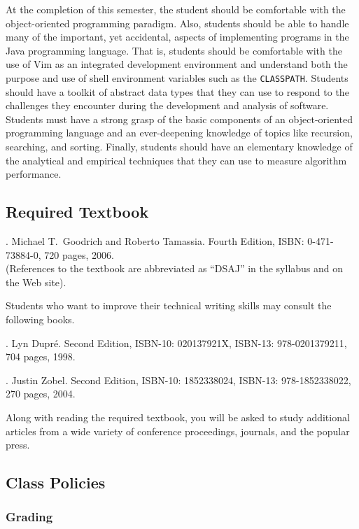 At the completion of this semester, the student should be comfortable with the object-oriented programming paradigm.
Also, students should be able to handle many of the important, yet accidental, aspects of implementing programs in the
Java programming language.  That is, students should be comfortable with the use of Vim as an integrated development
environment and understand both the purpose and use of shell environment variables such as the {\tt CLASSPATH}.
Students should have a toolkit of abstract data types that they can use to respond to the challenges they encounter
during the development and analysis of software.  Students must have a strong grasp of the basic components of an
object-oriented programming language and an ever-deepening knowledge of topics like recursion, searching, and sorting.
Finally, students should have an elementary knowledge of the analytical and empirical techniques that they can use to
measure algorithm performance.

\subsection*{Required Textbook}

. Michael T.\ Goodrich and Roberto Tamassia.
Fourth Edition, ISBN: 0-471-73884-0, 720 pages, 2006. \\
(References to the textbook are abbreviated as ``DSAJ'' in the syllabus and on the Web site).

\noindent
Students who want to improve their technical writing skills may consult the following books.

. Lyn Dupr\'e. Second Edition,  ISBN-10: 020137921X,
ISBN-13: 978-0201379211, 704 pages, 1998.

.  Justin Zobel. Second Edition,  ISBN-10: 1852338024, ISBN-13:
978-1852338022, 270 pages, 2004.

\noindent
Along with reading the required textbook, you will be asked to study additional articles from a wide variety of
conference proceedings, journals, and the popular press.

\subsection*{Class Policies}

\subsubsection*{Grading}

